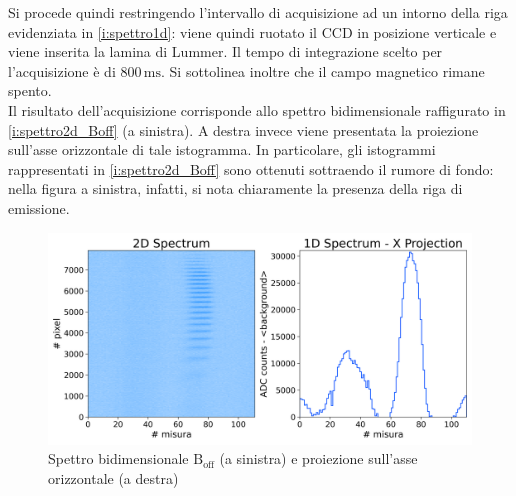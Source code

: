 \documentclass[twocolumn,10pt]{asme2ej}
\begin{document}
Si procede quindi restringendo l'intervallo di acquisizione ad un intorno della riga evidenziata in
\autoref{i:spettro1d}: viene quindi ruotato il CCD in posizione verticale e viene inserita la lamina di Lummer. Il tempo
di integrazione scelto per l'acquisizione è di $800\,\si{\milli\second}$. Si sottolinea inoltre che il campo magnetico
rimane spento. \\
Il risultato dell'acquisizione corrisponde allo spettro bidimensionale raffigurato in \autoref{i:spettro2d_Boff} (a
sinistra). A destra invece viene presentata la proiezione sull'asse orizzontale di tale istogramma. In particolare, gli
istogrammi rappresentati in \autoref{i:spettro2d_Boff} sono ottenuti sottraendo il rumore di fondo: nella figura a
sinistra, infatti, si nota chiaramente la presenza della riga di emissione. 

\begin{figure}
    \centering
    \includegraphics[width=\linewidth]{../Plots/Boff_2d_spectrum.png}
    \caption{Spettro bidimensionale $\text{B}_{\text{off}}$ (a sinistra) e proiezione sull'asse orizzontale (a destra)}
    \label{i:spettro2d_Boff}
    \vspace{-10pt}
\end{figure}
\end{document}
